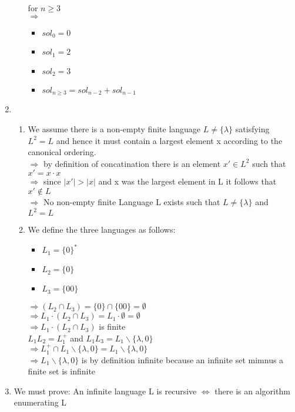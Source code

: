 \documentclass[8pt]{extreport}
\begin{document}
\begin{enumerate}
\begin{enumerate}[label = \alph*)]
\begin{enumerate}
\end{enumerate}
for $n\geq 3$\\
$\Rightarrow$
\begin{itemize}
\item $sol_{0}  = 0$
\item $sol_{1} = 2$
\item $sol_{2} = 3$
\item $sol_{n \geq  3} = sol_{n-2} + sol_{n-1}$
\end{itemize}
\end{enumerate}
\item 
\begin{enumerate}[label = \alph*)]
\item
We assume there is a non-empty finite language $L \neq \{\lambda\}$ satisfying $L^2 = L$ and hence it must contain a largest element x according to the canonical ordering.\\
$\Rightarrow$ by definition of concatination there is an element $x' \in L^2$ such that $ x' = x\cdot x$ \\
$\Rightarrow$ since $|x'| > |x|$ and x was the largest element in L it follows that $x' \notin L$\\
$\Rightarrow$ No non-empty finite Language L exists such that $L \neq \{\lambda\}$ and $L^2 = L$
\item We define the three languages as follows:
\begin{itemize}
\item $L_1 = \{0\}^*$
\item $L_2 = \{0\}$
\item $L_3 = \{00\}$
\end{itemize}
$\Rightarrow  (L_2 \cap L_3) = \{0\} \cap \{00\} = \emptyset$\\
$\Rightarrow L_1 \cdot (L_2 \cap L_3)  = L_1\cdot \emptyset = \emptyset$\\
$\Rightarrow L_1 \cdot (L_2 \cap L_3)$ is finite\\
\newline
$L_1L_2 = L_1^+$ and $L_1L_3 = L_1\backslash\{\lambda,0\}$\\
$\Rightarrow L_1^+ \cap L_1\backslash\{\lambda,0\} = L_1\backslash\{\lambda,0\}$ \\
$\Rightarrow L_1\backslash\{\lambda,0\}$ is by definition infinite because an infinite set mimnus a finite set is infinite
\end{enumerate}
\item We must prove: An infinite language L is recursive $\iff$ there is an algorithm enumerating L\\

\end{enumerate}
\end{document}
